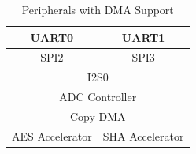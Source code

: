 
\begin{table}[H]
    \centering
    \caption{Peripherals with DMA Support}
    \label{table:Module_with_DMA}
 \begin{tabular}{|*{6}{c|}}

    \hline
    \multicolumn{3}{|c|}{UART0} & \multicolumn{3}{c|}{UART1}   \\
    \hline
    \hline
    \multicolumn{3}{|c|}{SPI2} & \multicolumn{3}{c|}{SPI3} \\
    \hline
    \hline
    \multicolumn{6}{|c|}{I2S0}  \\
    \hline
    \hline
    \multicolumn{6}{|c|}{ADC Controller} \\
    \hline
    \hline
    \multicolumn{6}{|c|}{Copy DMA} \\
    \hline
    \hline
    \multicolumn{3}{|c|}{AES Accelerator} & \multicolumn{3}{c|}{SHA Accelerator} \\
    \hline
\end{tabular}
\end{table}
